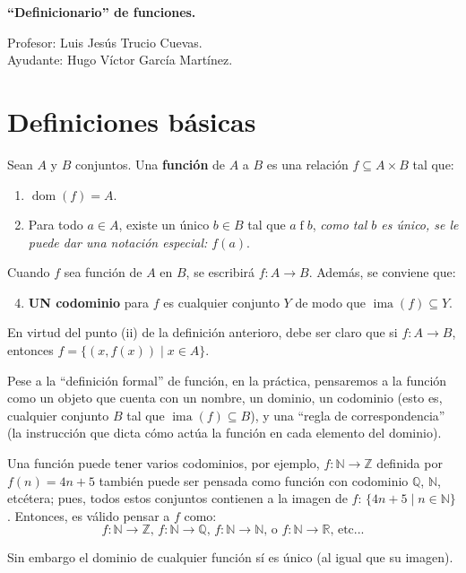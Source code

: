 \documentclass[letterpaper,DIV=14,headsepline,12pt]{scrartcl}
\providecommand\tq{\;|\;}
\DeclareMathOperator{\ima}{ima}
\DeclareMathOperator{\dom}{dom}
\begin{document}
    \pagestyle{scrheadings}
    \thispagestyle{beginstyle}
    \begin{center}
        {\fontsize{30}{60}\rmfamily \textbf{``Definicionario'' de funciones.}}
    \end{center}
    \begin{flushright}
        \footnotesize \hfill Profesor: Luis Jesús Trucio Cuevas.\\
        \hfill Ayudante: Hugo Víctor García Martínez.
    \end{flushright}

    \tableofcontents

    \newpage
    \section{Definiciones básicas}

    \begin{definicion}
        Sean $A$ y $B$ conjuntos. Una \textbf{función} de $A$ a $B$ es una relación $f \subseteq A \times B$ tal que:
        \begin{enumerate}
            \item $\dom(f)=A$.
            \item Para todo $a \in A$, existe un único $b \in B$ tal que $a \mathrel{f} b$, \textit{como tal $b$ es único, se le puede dar una notación especial: $f(a)$}.
        \end{enumerate}
        Cuando $f$ sea función de $A$ en $B$, se escribirá $f: A \to B$. Además, se conviene que:
        \begin{enumerate} \setcounter{enumi}{3}
            \item \textbf{UN codominio} para $f$ es cualquier conjunto $Y$ de modo que $\ima(f) \subseteq Y$.
        \end{enumerate}
    \end{definicion}

    En virtud del punto (ii) de la definición anterioro, debe ser claro que si $f:A \to B$, entonces $f=\{(x,f(x)) \tq x \in A \}$.

    Pese a la ``definición formal'' de función, en la práctica, pensaremos a la función como un objeto que cuenta con un nombre, un dominio, un codominio (esto es, cualquier conjunto $B$ tal que $\ima(f)\subseteq B$), y una ``regla de correspondencia'' (la instrucción que dicta cómo actúa la función en cada elemento del dominio).

    \begin{observacion}
        Una función puede tener varios codominios, por ejemplo, $f:\mathbb{N} \to \mathbb{Z}$ definida por $f(n)=4n+5$ también puede ser pensada como función con codominio $\mathbb{Q}$, $\mathbb{N}$, etcétera; pues, todos estos conjuntos contienen a la imagen de $f$: $\{ 4n+5 \tq n \in \mathbb{N} \}$. Entonces, es válido pensar a $f$ como:
        \[ f:\mathbb{N} \to \mathbb{Z} \text{, } f:\mathbb{N} \to \mathbb{Q} \text{, } f:\mathbb{N} \to \mathbb{N} \text{, o } f:\mathbb{N} \to \mathbb{R} \text{, etc...} \]

        Sin embargo el dominio de cualquier función sí es único (al igual que su imagen).
    \end{observacion}
\end{document}

